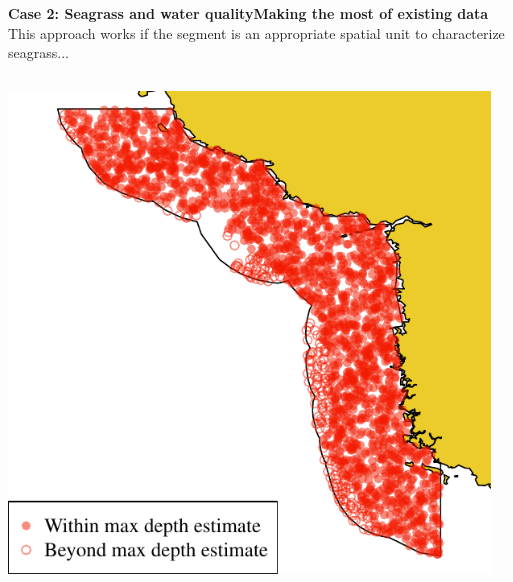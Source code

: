 \documentclass[serif]{beamer}\usepackage[]{graphicx}\usepackage[]{color}
\makeatletter
\def\maxwidth{ %
  \ifdim\Gin@nat@width>\linewidth
    \linewidth
  \else
    \Gin@nat@width
  \fi
}
\newenvironment{knitrout}{}{} %
\makeatother
\begin{document}
\begin{frame}{\textbf{Case 2: Seagrass and water quality}}{\textbf{Making the most of existing data}}
\onslide<+->
This approach works if the segment is an appropriate spatial unit to characterize seagrass...
\begin{columns}[T]
\onslide<+->
\begin{column}{0.45\textwidth}
\begin{knitrout}
\color{fgcolor}

{\centering \includegraphics[width=\maxwidth]{fig//docfail1} 

}



\end{knitrout}
\end{column}
\onslide<+->
\begin{column}{0.45\textwidth}
\begin{knitrout}
\color{fgcolor}


\end{knitrout}
\end{column}
\end{columns}
\end{frame}
\end{document}
